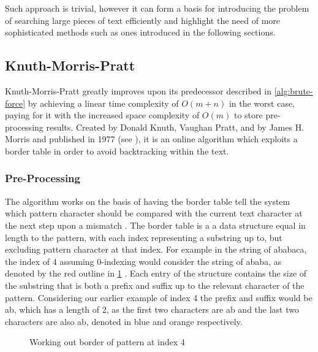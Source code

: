 \documentclass{l4proj}
\begin{document}
Such approach is trivial, however it can form a basis for introducing the problem of searching large pieces of text efficiently and highlight the need of more sophisticated methods such as ones introduced in the following sections.

\subsection{Knuth-Morris-Pratt}

Knuth-Morris-Pratt greatly improves upon its predecessor described in \ref{alg:brute-force} by achieving a linear time complexity of $O(m+n)$ in the worst case, paying for it with the increased space complexity of  $O(m)$ to store pre-processing results. Created by Donald Knuth, Vaughan Pratt, and by James H. Morris and published in 1977 (see \cite{KMP}), it is an online algorithm which exploits a border table in order to avoid backtracking within the text.

\subsubsection{Pre-Processing}
The algorithm works on the basis of having the border table tell the system which pattern character should be compared with the current text character at the next step upon a mismatch . The border table is a a data structure equal in length to the pattern, with each index representing a substring up to, but excluding pattern character at that index. For example in the string of ababaca, the index of 4 assuming 0-indexing would consider the string of ababa, as denoted by the red outline in \ref{fig:kmp-pre-process} . Each entry of the structure contains the size of the substring that is both a prefix and suffix up to the relevant character of the pattern. Considering our earlier example of index 4 the prefix and suffix would be ab, which has a length of 2, as the first two characters are ab and the last two characters are also ab, denoted in blue and orange respectively.

\begin{figure}[hpt]
  \centering
  \caption{Working out border of pattern at index 4}
  \label{fig:kmp-pre-process}
\end{figure}
\end{document}
